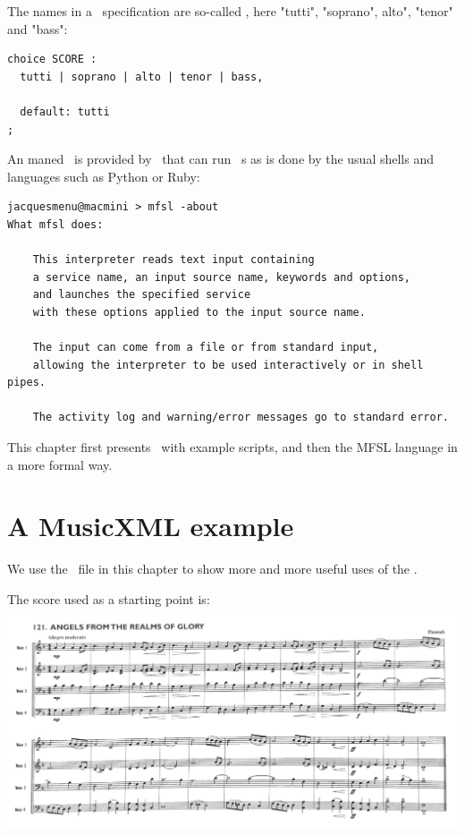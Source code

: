 The names in a \choice\ specification are so-called , here "tutti", "soprano", alto", "tenor" and "bass":
\begin{lstlisting}[language=MFSL]
choice SCORE :
  tutti | soprano | alto | tenor | bass,

  default: tutti
;
\end{lstlisting}

An  maned \mfslExec\ is provided by \mf\, that can run \mfslLang\ \script s as is done by the usual shells and languages such as Python or Ruby:
\begin{lstlisting}[language=Terminal]
jacquesmenu@macmini > mfsl -about
What mfsl does:

    This interpreter reads text input containing
    a service name, an input source name, keywords and options,
    and launches the specified service
    with these options applied to the input source name.

    The input can come from a file or from standard input,
    allowing the interpreter to be used interactively or in shell pipes.

    The activity log and warning/error messages go to standard error.
\end{lstlisting}

This chapter first presents \mfslLang\ with example scripts, and then the MFSL language in a more formal way.


\section{A MusicXML example}

We use the  \mxml\ file in this chapter to show more and more useful uses of the \mfslInterp.

The score used as a starting point is:\\
\includegraphics[scale=0.5]{../mfgraphics/mfgraphicsHymn121_OrigianlScore.png}

